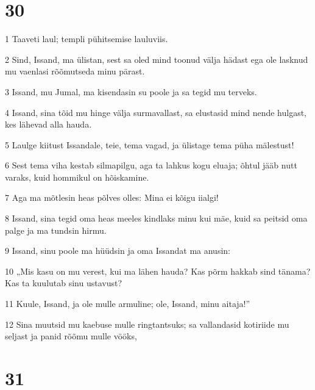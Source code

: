 \chapter{30}

\par 1 Taaveti laul; templi pühitsemise lauluviis.
\par 2 Sind, Issand, ma ülistan, sest sa oled mind toonud välja hädast ega ole lasknud mu vaenlasi rõõmutseda minu pärast.
\par 3 Issand, mu Jumal, ma kisendasin su poole ja sa tegid mu terveks.
\par 4 Issand, sina tõid mu hinge välja surmavallast, sa elustasid mind nende hulgast, kes lähevad alla hauda.
\par 5 Laulge kiitust Issandale, teie, tema vagad, ja ülistage tema püha mälestust!
\par 6 Sest tema viha kestab silmapilgu, aga ta lahkus kogu eluaja; õhtul jääb nutt varaks, kuid hommikul on hõiskamine.
\par 7 Aga ma mõtlesin heas põlves olles: Mina ei kõigu iialgi!
\par 8 Issand, sina tegid oma heas meeles kindlaks minu kui mäe, kuid sa peitsid oma palge ja ma tundsin hirmu.
\par 9 Issand, sinu poole ma hüüdsin ja oma Issandat ma anusin:
\par 10 „Mis kasu on mu verest, kui ma lähen hauda? Kas põrm hakkab sind tänama? Kas ta kuulutab sinu ustavust?
\par 11 Kuule, Issand, ja ole mulle armuline; ole, Issand, minu aitaja!”
\par 12 Sina muutsid mu kaebuse mulle ringtantsuks; sa vallandasid kotiriide mu seljast ja panid rõõmu mulle vööks,

\chapter{31}

